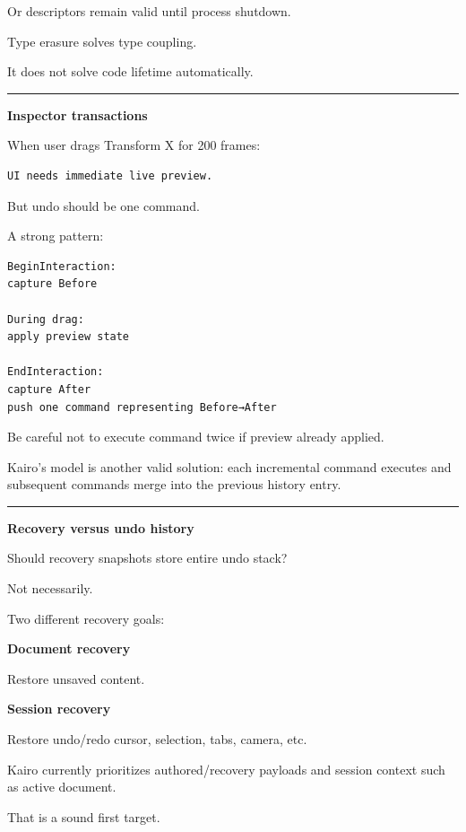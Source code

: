 Or descriptors remain valid until process shutdown.

Type erasure solves type coupling.

It does not solve code lifetime automatically.

\begin{center}\rule{0.5\linewidth}{0.5pt}\end{center}

\textbf{Inspector transactions}

When user drags Transform X for 200 frames:

\begin{verbatim}
UI needs immediate live preview.
\end{verbatim}

But undo should be one command.

A strong pattern:

\begin{verbatim}
BeginInteraction:
capture Before

During drag:
apply preview state

EndInteraction:
capture After
push one command representing Before→After
\end{verbatim}

Be careful not to execute command twice if preview already applied.

Kairo's  model is another valid solution: each incremental command executes and subsequent commands merge into the previous history entry.

\begin{center}\rule{0.5\linewidth}{0.5pt}\end{center}

\textbf{Recovery versus undo history}

Should recovery snapshots store entire undo stack?

Not necessarily.

Two different recovery goals:

\textbf{Document recovery}

Restore unsaved content.

\textbf{Session recovery}

Restore undo/redo cursor, selection, tabs, camera, etc.

Kairo currently prioritizes authored/recovery payloads and session context such as active document.

That is a sound first target.

